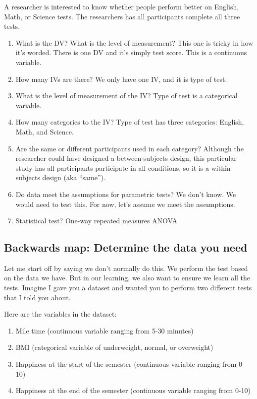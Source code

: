 \documentclass[
]{book}
\providecommand{\tightlist}{%
  \setlength{\itemsep}{0pt}\setlength{\parskip}{0pt}}
\begin{document}
A researcher is interested to know whether people perform better on English, Math, or Science tests. The researchers has all participants complete all three tests.

\begin{enumerate}
\def\labelenumi{\arabic{enumi}.}
\item
  What is the DV? What is the level of measurement? This one is tricky in how it's worded. There is one DV and it's simply test score. This is a continuous variable.
\item
  How many IVs are there? We only have one IV, and it is type of test.
\item
  What is the level of measurement of the IV? Type of test is a categorical variable.
\item
  How many categories to the IV? Type of test has three categories: English, Math, and Science.
\item
  Are the same or different participants used in each category? Although the researcher could have designed a between-subjects design, this particular study has all participants participate in all conditions, so it is a within-subjects design (aka ``same'').
\item
  Do data meet the assumptions for parametric tests? We don't know. We would need to test this. For now, let's assume we meet the assumptions.
\item
  Statistical test? One-way repeated measures ANOVA
\end{enumerate}

\hypertarget{backwards-map-determine-the-data-you-need}{%
\subsection{Backwards map: Determine the data you need}\label{backwards-map-determine-the-data-you-need}}

Let me start off by saying we don't normally do this. We perform the test based on the data we have. But in our learning, we also want to ensure we learn all the tests. Imagine I gave you a dataset and wanted you to perform two different tests that I told you about.

Here are the variables in the dataset:

\begin{enumerate}
\def\labelenumi{\arabic{enumi}.}
\tightlist
\item
  Mile time (continuous variable ranging from 5-30 minutes)
\item
  BMI (categorical variable of underweight, normal, or overweight)
\item
  Happiness at the start of the semester (continuous variable ranging from 0-10)
\item
  Happiness at the end of the semester (continuous variable ranging from 0-10)
\end{enumerate}
\end{document}
